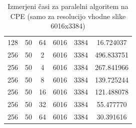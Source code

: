 \documentclass[11pt]{article}
\begin{document}
\begin{table}[H]
\begin{tabular}{c|c|c|c|c|c}
        128 & 50  & 64  & 6016    & 3384     & 16.724037  \\
        256 & 50  & 2   & 6016    & 3384     & 496.833751 \\
        256 & 50  & 4   & 6016    & 3384     & 267.841966 \\
        256 & 50  & 8   & 6016    & 3384     & 139.725244 \\
        256 & 50  & 16  & 6016    & 3384     & 121.488078 \\
        256 & 50  & 32  & 6016    & 3384     & 55.477770  \\
        256 & 50  & 64  & 6016    & 3384     & 30.391616  \\
    \end{tabular}
    \caption{Izmerjeni časi za paralelni algoritem na CPE (samo za resolucijo vhodne slike 6016x3384)}
\end{table}
\end{document}
